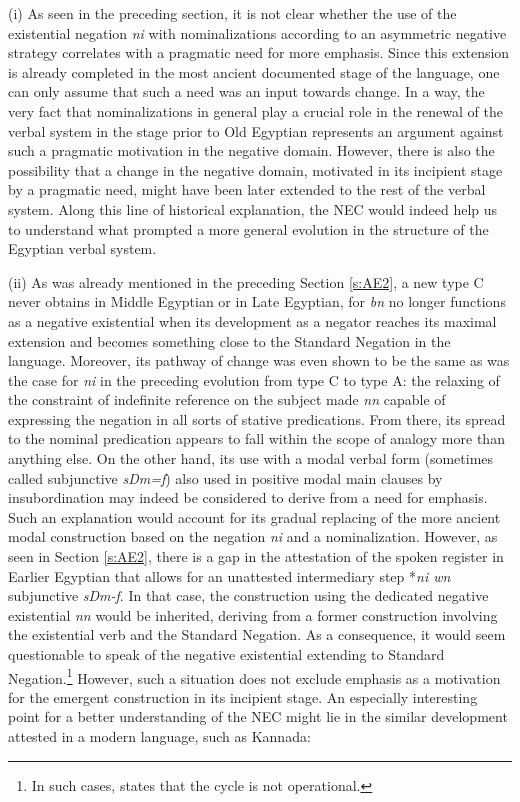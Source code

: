 \documentclass[output=paper]{langsci/langscibook}
\begin{document}
(i) As seen in the preceding section, it is not clear whether the use of the existential negation \textit{ni} with nominalizations according to an asymmetric negative strategy correlates with a pragmatic need for more emphasis. Since this extension is already completed in the most ancient documented stage of the language, one can only assume that such a need was an input towards change. In a way, the very fact that nominalizations in general play a crucial role in the renewal of the verbal system in the stage prior to Old Egyptian represents an argument against such a pragmatic motivation in the negative domain. However, there is also the possibility that a change in the negative domain, motivated in its incipient stage by a pragmatic need, might have been later extended to the rest of the verbal system. Along this line of historical explanation, the NEC would indeed help us to understand what prompted a more general evolution in the structure of the Egyptian verbal system.

(ii) As was already mentioned in the preceding Section \ref{s:AE2}, a new type C never obtains in Middle Egyptian or in Late Egyptian, for \textit{bn} no longer functions as a negative existential when its development as a negator reaches its maximal extension and becomes something close to the Standard Negation in the language. Moreover, its pathway of change was even shown to be the same as was the case for \textit{ni} in the preceding evolution from type C to type A: the relaxing of the constraint of indefinite reference on the subject made \textit{nn} capable of expressing the negation in all sorts of stative predications. From there, its spread to the nominal predication appears to fall within the scope of analogy more than anything else. On the other hand, its use with a modal verbal form (sometimes called subjunctive \textit{sDm=f})  also used in positive modal main clauses by insubordination may indeed be considered to derive from a need for emphasis. Such an explanation would account for its gradual replacing of the more ancient modal construction based on the negation \textit{ni} and a nominalization. However, as seen in Section \ref{s:AE2}, there is a gap in the attestation of the spoken register in Earlier Egyptian that allows for an unattested intermediary step *\textit{ni wn} subjunctive \textit{sDm-f}. In that case, the construction using the dedicated negative existential \textit{nn} would be inherited, deriving from a former construction involving the existential verb and the Standard Negation. As a consequence, it would seem questionable to speak of the negative existential extending to Standard Negation.\footnote{In such cases, \citet{Veselinova2014} states that the cycle is not operational.}
However, such a situation does not exclude emphasis as a motivation for the emergent construction in its incipient stage. An especially interesting point for a better understanding of the NEC might lie in the similar development attested in a modern language, such as Kannada:
\end{document}
